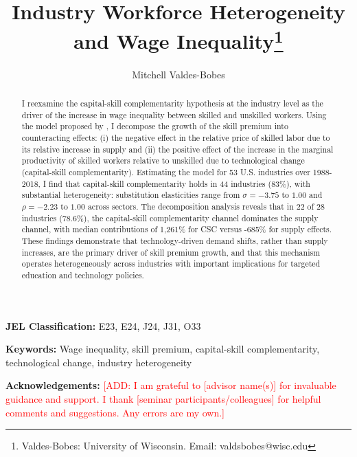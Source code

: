 \documentclass[12pt]{article}
\begin{document}
\sloppy
\title{Industry Workforce Heterogeneity and Wage Inequality\thanks{Valdes-Bobes: University of Wisconsin. Email: valdsbobes@wisc.edu}}
\author{Mitchell Valdes-Bobes}
\maketitle
\begin{abstract}
 I reexamine the capital-skill complementarity hypothesis at the industry level as the driver of the increase in wage inequality between skilled and unskilled workers. Using the model proposed by \citet*{krusell2000capital}, I decompose the growth of the skill premium into counteracting effects: (i) the negative effect in the relative price of skilled labor due to its relative increase in supply and (ii) the positive effect of the increase in the marginal productivity of skilled workers relative to unskilled due to technological change (capital-skill complementarity). Estimating the model for 53 U.S. industries over 1988-2018, I find that capital-skill complementarity holds in 44 industries (83\%), with substantial heterogeneity: substitution elasticities range from $\sigma = -3.75$ to $1.00$ and $\rho = -2.23$ to $1.00$ across sectors. The decomposition analysis reveals that in 22 of 28 industries (78.6\%), the capital-skill complementarity channel dominates the supply channel, with median contributions of 1,261\% for CSC versus -685\% for supply effects. These findings demonstrate that technology-driven demand shifts, rather than supply increases, are the primary driver of skill premium growth, and that this mechanism operates heterogeneously across industries with important implications for targeted education and technology policies.
\end{abstract}

\vspace{0.3cm}

\noindent \textbf{JEL Classification:} E23, E24, J24, J31, O33

\vspace{0.2cm}

\noindent \textbf{Keywords:} Wage inequality, skill premium, capital-skill complementarity, technological change, industry heterogeneity

\vspace{0.5cm}

\noindent \textbf{Acknowledgements:} \textcolor{red}{[ADD: I am grateful to [advisor name(s)] for invaluable guidance and support. I thank [seminar participants/colleagues] for helpful comments and suggestions. Any errors are my own.]}
\end{document}
